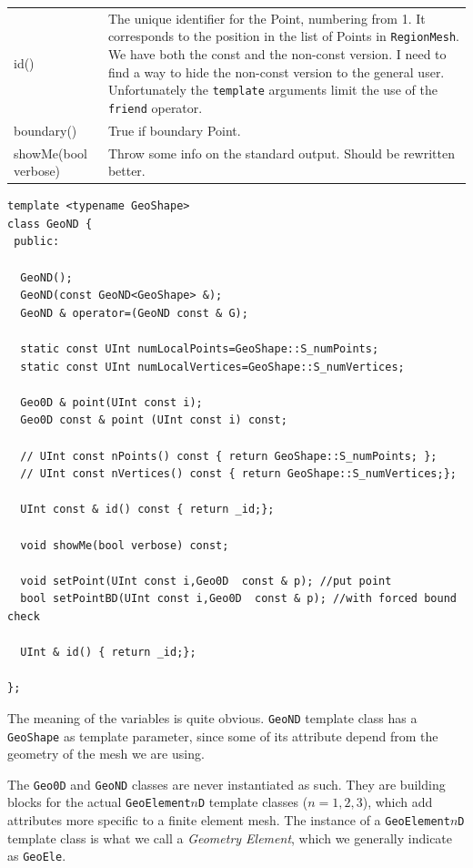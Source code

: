 \begin{tabularx}{\textwidth}{lX} 
\hline 
id() & The unique identifier for the Point, numbering from 1.
  It corresponds to the position in the list of Points in
  \texttt{RegionMesh}. We have both the const and the non-const
  version. I need to find a way to hide the non-const version to the
  general user.  Unfortunately the \texttt{template} arguments limit
  the use of the
  \texttt{friend} operator.\\
  boundary() & True if boundary Point.\\
  showMe(bool verbose) & Throw some info on the standard output. Should be rewritten better.\\
\hline
\end{tabularx}

\begin{verbatim}
template <typename GeoShape>
class GeoND {
 public:
  
  GeoND();
  GeoND(const GeoND<GeoShape> &);
  GeoND & operator=(GeoND const & G); 
  
  static const UInt numLocalPoints=GeoShape::S_numPoints;
  static const UInt numLocalVertices=GeoShape::S_numVertices;
  
  Geo0D & point(UInt const i); 
  Geo0D const & point (UInt const i) const;
  
  // UInt const nPoints() const { return GeoShape::S_numPoints; };
  // UInt const nVertices() const { return GeoShape::S_numVertices;};
  
  UInt const & id() const { return _id;}; 
  
  void showMe(bool verbose) const;
  
  void setPoint(UInt const i,Geo0D  const & p); //put point 
  bool setPointBD(UInt const i,Geo0D  const & p); //with forced bound check
  
  UInt & id() { return _id;};
  
};
\end{verbatim}
The meaning of the variables is quite obvious. \texttt{GeoND} template class
has a \texttt{GeoShape} as template parameter, since some of its
attribute depend from the geometry of the mesh we are using.

The \texttt{Geo0D} and \texttt{GeoND} classes are never instantiated
as such. They are building blocks for the actual
\texttt{GeoElement$n$D} template classes ($n=1,2,3$), which add
attributes more specific to a finite element mesh. The instance of a
\texttt{GeoElement$n$D} template class is what we call a
\emph{Geometry Element}, which we generally
indicate as \texttt{GeoEle}.

